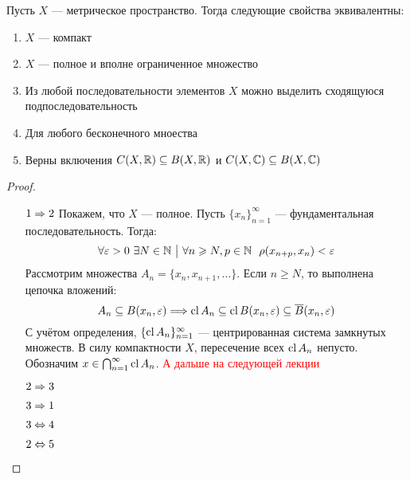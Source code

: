 \begin{theorem}
	Пусть $X$ --- метрическое пространство. Тогда следующие свойства эквивалентны:
	\begin{enumerate}
		\item $X$ --- компакт
		
		\item $X$ --- полное и вполне ограниченное множество
		
		\item Из любой последовательности элементов $X$ можно выделить сходящуюся подпоследовательность
		
		\item Для любого бесконечного мноества 
		
		\item Верны включения $C(X, \mathbb{R}) \subseteq B(X, \mathbb{R})$ и $C(X, \mathbb{C}) \subseteq B(X, \mathbb{C})$
	\end{enumerate}
\end{theorem}

\begin{proof}~
	\begin{enumerate}
		\item[$1 \Rightarrow 2$] Покажем, что $X$ --- полное. Пусть $\{x_n\}_{n = 1}^\infty$ --- фундаментальная последовательность. Тогда:
		\[
			\forall \varepsilon > 0\ \exists N \in \mathbb{N} \ \big|\  \forall n \geqslant N, p \in \mathbb{N}\ \ \rho(x_{n + p}, x_n) < \varepsilon
		\]
		Рассмотрим множества $A_n = \{x_n, x_{n + 1}, \ldots\}$. Если $n \ge N$, то выполнена цепочка вложений:
		\[
			A_n \subseteq B(x_n, \varepsilon) \Longrightarrow \operatorname{cl} A_n \subseteq \operatorname{cl} B(x_n, \varepsilon) \subseteq \overline{B}(x_n, \varepsilon)
		\]
		С учётом определения, $\{\operatorname{cl} A_n\}_{n = 1}^\infty$ --- центрированная система замкнутых множеств. В силу компактности $X$, пересечение всех $\operatorname{cl} A_n$ непусто. Обозначим $x \in \bigcap_{n = 1}^\infty \operatorname{cl} A_n$. \textcolor{red}{А дальше на следующей лекции}
		
		\item[$2 \Rightarrow 3$]
		
		\item[$3 \Rightarrow 1$]
		
		\item[$3 \Leftrightarrow 4$]
		
		\item[$2 \Leftrightarrow 5$]
	\end{enumerate}
\end{proof}